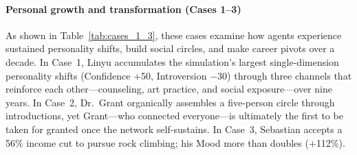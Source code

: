 \paragraph{Personal growth and transformation (Cases 1--3)}
As shown in Table~\ref{tab:cases_1_3}, these cases examine how agents experience sustained personality shifts, build social circles, and make career pivots over a decade.
In Case~1, Linyu accumulates the simulation's largest single-dimension personality shifts
(Confidence $+$50, Introversion $-$30) through three channels that reinforce each other---counseling, art practice, and social exposure---over nine years.
In Case~2, Dr.~Grant organically assembles a five-person circle through introductions,
yet Grant---who connected everyone---is ultimately the first to be taken for granted once the network self-sustains.
In Case~3, Sebastian accepts a 56\% income cut to pursue rock climbing;
his Mood more than doubles ($+$112\%).


